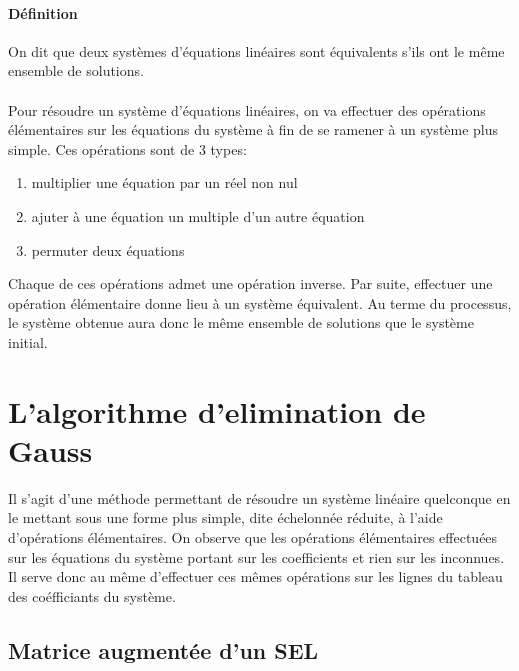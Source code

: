 \paragraph{Définition} On dit que deux systèmes d'équations linéaires sont équivalents s'ils ont le même ensemble de solutions.

\paragraph{} Pour résoudre un système d'équations linéaires, on va effectuer des opérations élémentaires sur les équations du système à fin de se ramener à un système plus simple. Ces opérations sont de 3 types:
\begin{enumerate}[ a)]
  \item multiplier une équation par un réel non nul
  \item ajuter à une équation un multiple d'un autre équation
  \item permuter deux équations
\end{enumerate}

Chaque de ces opérations admet une opération inverse. Par suite, effectuer une opération élémentaire donne lieu à un système équivalent. Au terme du processus, le système obtenue aura donc le même ensemble de solutions que le système initial.

%
%
\section{L'algorithme d'elimination de Gauss}
%
%
Il s'agit d'une méthode permettant de résoudre un système linéaire quelconque en le mettant sous une forme plus simple, dite échelonnée réduite, à l'aide d'opérations élémentaires.
On observe que les opérations élémentaires effectuées sur les équations du système portant sur les coefficients et rien sur les inconnues. Il serve donc au même d'effectuer ces mêmes opérations sur les lignes du tableau des coéfficiants du système.

%
\subsection{Matrice augmentée d'un SEL}
%
